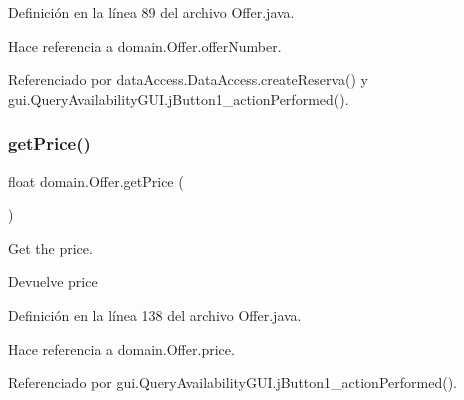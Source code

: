 Definición en la línea 89 del archivo Offer.\+java.


\begin{DoxyCode}{0}

\end{DoxyCode}


Hace referencia a domain.\+Offer.\+offer\+Number.



Referenciado por data\+Access.\+Data\+Access.\+create\+Reserva() y gui.\+Query\+Availability\+G\+U\+I.\+j\+Button1\+\_\+action\+Performed().

\mbox{\label{classdomain_1_1_offer_a4ebf9c6f415709b527e006fdffa3a0c3}} 
\subsubsection{\texorpdfstring{getPrice()}{getPrice()}}
{\footnotesize\ttfamily float domain.\+Offer.\+get\+Price (\begin{DoxyParamCaption}{ }\end{DoxyParamCaption})}



Get the price. 

\begin{DoxyReturn}{Devuelve}
price 
\end{DoxyReturn}


Definición en la línea 138 del archivo Offer.\+java.


\begin{DoxyCode}{0}

\end{DoxyCode}


Hace referencia a domain.\+Offer.\+price.



Referenciado por gui.\+Query\+Availability\+G\+U\+I.\+j\+Button1\+\_\+action\+Performed().

\mbox{\label{classdomain_1_1_offer_a89339961be734e54a45fab7867120736}} 
